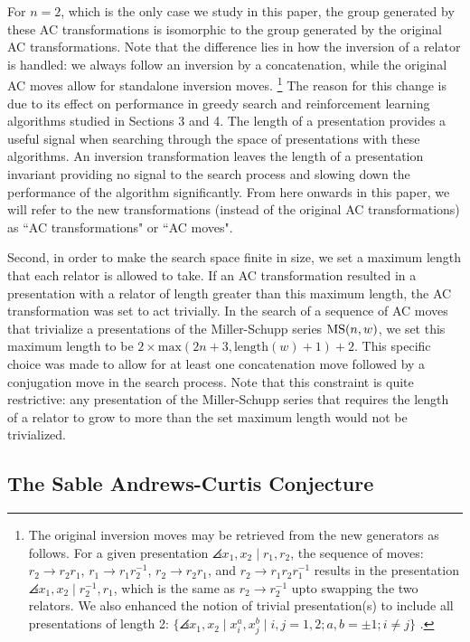 For $n=2$, which is the only case we study in this paper, the group generated by these AC transformations is isomorphic to the group generated by the original AC transformations. Note that the difference lies in how the inversion of a relator is handled: we always follow an inversion by a concatenation, while the original AC moves allow for standalone inversion moves. 
\footnote{The original inversion moves may be retrieved from the new generators as follows. For a given presentation $\angles{x_1, x_2 \mid r_1, r_2}$, the sequence of moves: $r_2 \to r_2 r_1$, $r_1 \to r_1 r_2^{-1}$, $r_2 \to r_2 r_1$, and $r_2 \to r_1 r_2 r_1^{-1}$ results in the presentation $\angles{x_1, x_2 \mid r_2^{-1}, r_1}$, which is the same as $r_2 \to r_2^{-1}$ upto swapping the two relators. We also enhanced the notion of trivial presentation(s) to include all presentations of length 2: $\{\angles{x_1, x_2 \mid x_i^{a}, x_j^{b}}  \mid i, j = 1, 2; a, b = \pm 1; i \neq j \}$ .
}
The reason for this change is due to its effect on performance in greedy search and reinforcement learning algorithms studied in Sections 3 and 4. The length of a presentation provides a useful signal when searching through the space of presentations with these algorithms. An inversion transformation leaves the length of a presentation invariant providing no signal to the search process and slowing down the performance of the algorithm significantly. 
From here onwards in this paper, we will refer to the new transformations (instead of the original AC transformations) as  ``AC transformations" or ``AC moves".
\newline

Second, in order to make the search space finite in size, we set a maximum length that each relator is allowed to take. If an AC transformation resulted in a presentation with a relator of length greater than this maximum length, the AC transformation was set to act trivially. In the search of a sequence of AC moves that trivialize a presentations of the Miller-Schupp series $\text{MS}(n, w)$, we set this maximum length to be $2 \times \text{max}(2 n+3, \text{length}(w)+1) + 2$. This specific choice was made to allow for at least one concatenation move followed by a conjugation move in the search process. Note that this constraint is quite restrictive: any presentation of the Miller-Schupp series that requires the length of a relator to grow to more than the set maximum length would not be trivialized. 

\subsection*{The Sable Andrews-Curtis Conjecture}

